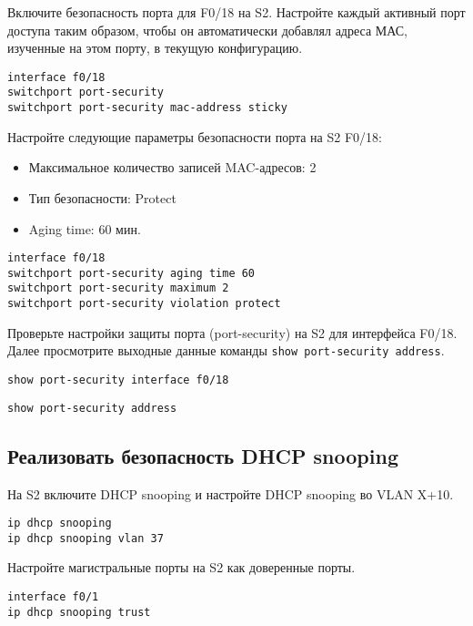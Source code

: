 Включите безопасность порта для F0/18 на S2.
Настройте каждый активный порт доступа таким образом,
чтобы он автоматически добавлял адреса МАС, изученные на этом порту,
в текущую конфигурацию.

\begin{verbatim}
interface f0/18
switchport port-security
switchport port-security mac-address sticky
\end{verbatim}

Настройте следующие параметры безопасности порта на S2 F0/18:

\begin{itemize}
    \item Максимальное количество записей MAC-адресов: 2
    \item Тип безопасности: Protect
    \item Aging time: 60 мин.
\end{itemize}

\begin{verbatim}
interface f0/18
switchport port-security aging time 60
switchport port-security maximum 2
switchport port-security violation protect
\end{verbatim}

Проверьте настройки защиты порта (port-security)
на S2 для интерфейса F0/18. Далее просмотрите выходные
данные команды \texttt{show port-security address}.

\begin{verbatim}
show port-security interface f0/18
\end{verbatim}

\begin{verbatim}
show port-security address
\end{verbatim}

\subsection{Реализовать безопасность DHCP snooping}

На S2 включите DHCP snooping и настройте DHCP snooping во VLAN X+10.

\begin{verbatim}
ip dhcp snooping
ip dhcp snooping vlan 37
\end{verbatim}

Настройте магистральные порты на S2 как доверенные порты.

\begin{verbatim}
interface f0/1
ip dhcp snooping trust
\end{verbatim}

